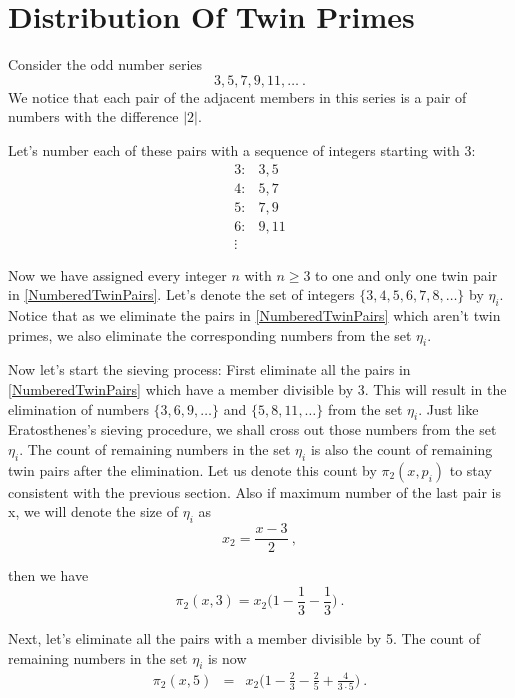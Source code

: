 \documentclass{article}
\numberwithin{equation}{section}
\begin{document}
\section{Distribution Of Twin Primes}
Consider the odd number series
\begin{equation} \label{OddNumberSeries}
3, 5, 7, 9, 11, \ldots ~ .
\end{equation}
We notice that each pair of the adjacent members in this series is a pair of numbers with the difference $\vert 2 \vert$. 

Let's number each of these pairs with a sequence of integers starting with 3:
\begin{eqnarray} \label{NumberedTwinPairs}
3: & 3,5 \nonumber \\
4: & 5,7 \nonumber \\
5: & 7,9 \nonumber \\
6: & 9,11 \nonumber \\
\vdots 
\end{eqnarray}

Now we have assigned every integer $n$ with $n \ge 3$ to one and only one twin pair in \eqref{NumberedTwinPairs}. Let's denote the set of integers $\{3, 4, 5, 6, 7, 8, \ldots\}$ by $\eta_i$. Notice that as we eliminate the pairs in \eqref{NumberedTwinPairs} which aren't twin primes, we also eliminate the corresponding numbers from the set $\eta_i$.

Now let's start the sieving process: First eliminate all the pairs in \eqref{NumberedTwinPairs} which have a member divisible by 3. This will result in the elimination of numbers $\{3, 6, 9, \ldots \}$ and $\{5, 8, 11, \ldots\}$ from the set $\eta_i$. Just like Eratosthenes's sieving procedure, we shall cross out those numbers from the set $\eta_i$. The count of remaining numbers in the set $\eta_i$ is also the count of remaining twin pairs after the elimination. Let us denote this count by $\pi_2(x,p_i)$ to stay consistent with the previous section. Also if maximum number of the last pair is x, we will denote the size of $\eta_i$ as 
\begin{equation} \nonumber
x_2 = \frac{x-3}{2} ~ ,
\end{equation}

then we have
\begin{equation} \nonumber
\pi_2(x,3) = x_2 \Big(1 - \frac{1}{3} - \frac{1}{3}\Big) ~ .
\end{equation}

Next, let's eliminate all the pairs with a member divisible by 5. The count of remaining numbers in the set $\eta_i$ is now
\begin{eqnarray} \nonumber
\pi_2(x,5) & = & x_2 \Big(1 - \frac{2}{3} - \frac{2}{5} + \frac{4}{3 \cdot 5}\Big) \nonumber ~ .
\end{eqnarray}
\end{document}
